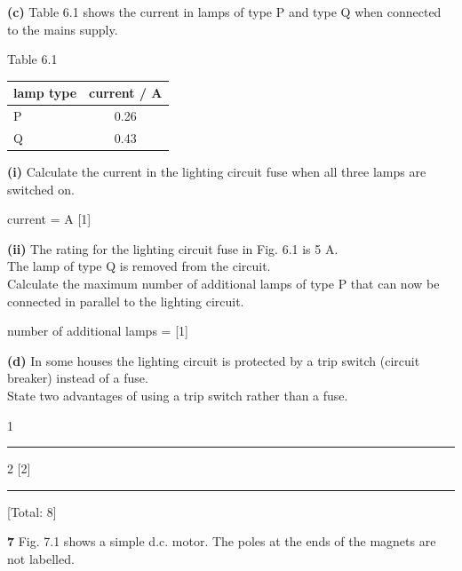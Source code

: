 \documentclass[11pt]{article}
\newcommand{\answerline}[1][3in]{\makebox[#1]{\hrulefill}}
\begin{document}
\newpage

\textbf{(c)} \quad Table 6.1 shows the current in lamps of type P and type Q when connected to the mains supply.

\begin{center}
Table 6.1\\[1ex]
\renewcommand{\arraystretch}{1.5}
\begin{tabular}{|l|c|}
\hline
lamp type & current / A \\
\hline
P & 0.26 \\
\hline
Q & 0.43 \\
\hline
\end{tabular}
\end{center}

\textbf{(i)} \quad Calculate the current in the lighting circuit fuse when all three lamps are switched on.

\vspace{2cm}
\hfill current = \answerline[2in] A [1]

\vspace{0.5cm}
\textbf{(ii)} \quad The rating for the lighting circuit fuse in Fig. 6.1 is 5 A.\\
The lamp of type Q is removed from the circuit.\\
Calculate the maximum number of additional lamps of type P that can now be connected in parallel to the lighting circuit.

\vspace{2cm}
\hfill number of additional lamps = \answerline[2in] [1]

\vspace{0.5cm}
\textbf{(d)} \quad In some houses the lighting circuit is protected by a trip switch (circuit breaker) instead of a fuse.\\
State two advantages of using a trip switch rather than a fuse.

\vspace{0.99cm}
1 \hrulefill
\vspace{0.99cm}
\hrule

\vspace{0.99cm}
2 \hrulefill \hfill [2]

\vspace{0.99cm}
\hrule
\vspace{0.99cm}
\hfill [Total: 8]

\newpage

\textbf{7} \quad Fig. 7.1 shows a simple d.c. motor. The poles at the ends of the magnets are not labelled.
\end{document}

